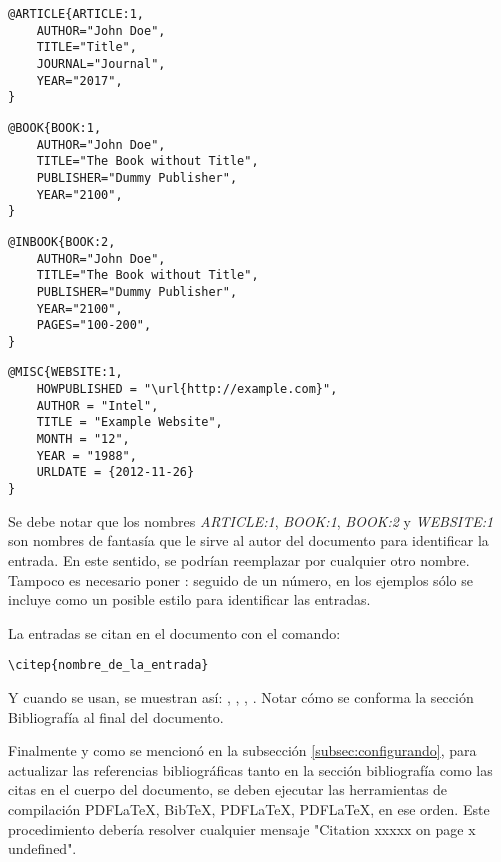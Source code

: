 \begin{lstlisting}
@ARTICLE{ARTICLE:1,
    AUTHOR="John Doe",
    TITLE="Title",
    JOURNAL="Journal",
    YEAR="2017",
}
\end{lstlisting}


\begin{lstlisting}
@BOOK{BOOK:1,
    AUTHOR="John Doe",
    TITLE="The Book without Title",
    PUBLISHER="Dummy Publisher",
    YEAR="2100",
}
\end{lstlisting}


\begin{lstlisting}
@INBOOK{BOOK:2,
    AUTHOR="John Doe",
    TITLE="The Book without Title",
    PUBLISHER="Dummy Publisher",
    YEAR="2100",
    PAGES="100-200",
}
\end{lstlisting}


\begin{lstlisting}
@MISC{WEBSITE:1,
    HOWPUBLISHED = "\url{http://example.com}",
    AUTHOR = "Intel",
    TITLE = "Example Website",
    MONTH = "12",
    YEAR = "1988",
    URLDATE = {2012-11-26}
}
\end{lstlisting}

Se debe notar que los nombres \emph{ARTICLE:1}, \emph{BOOK:1}, \emph{BOOK:2} y \emph{WEBSITE:1} son nombres de fantasía que le sirve al autor del documento para identificar la entrada. En este sentido, se podrían reemplazar por cualquier otro nombre.  Tampoco es necesario poner : seguido de un número, en los ejemplos sólo se incluye como un posible estilo para identificar las entradas.

La entradas se citan en el documento con el comando: 

\begin{verbatim}
\citep{nombre_de_la_entrada}
\end{verbatim}

Y cuando se usan, se muestran así: \citep{ARTICLE:1}, \citep{BOOK:1}, \citep{BOOK:2}, \citep{WEBSITE:1}.  Notar cómo se conforma la sección Bibliografía al final del documento.

Finalmente y como se mencionó en la subsección \ref{subsec:configurando}, para actualizar las referencias bibliográficas tanto en la sección bibliografía como las citas en el cuerpo del documento, se deben ejecutar las herramientas de compilación PDFLaTeX, BibTeX, PDFLaTeX, PDFLaTeX, en ese orden.  Este procedimiento debería resolver cualquier mensaje "Citation xxxxx on page x undefined".
